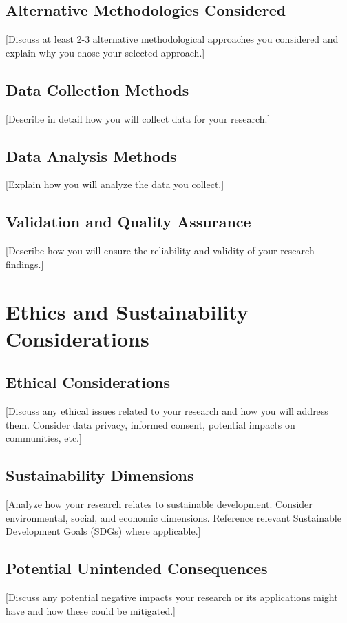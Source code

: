 \documentclass[12pt,a4paper]{article}
\begin{document}
\subsection{Alternative Methodologies Considered}
[Discuss at least 2-3 alternative methodological approaches you considered and explain why you chose your selected approach.]

\subsection{Data Collection Methods}
[Describe in detail how you will collect data for your research.]

\subsection{Data Analysis Methods}
[Explain how you will analyze the data you collect.]

\subsection{Validation and Quality Assurance}
[Describe how you will ensure the reliability and validity of your research findings.]

\section{Ethics and Sustainability Considerations}
\label{sec:ethics}

\subsection{Ethical Considerations}
[Discuss any ethical issues related to your research and how you will address them. Consider data privacy, informed consent, potential impacts on communities, etc.]

\subsection{Sustainability Dimensions}
[Analyze how your research relates to sustainable development. Consider environmental, social, and economic dimensions. Reference relevant Sustainable Development Goals (SDGs) where applicable.]

\subsection{Potential Unintended Consequences}
[Discuss any potential negative impacts your research or its applications might have and how these could be mitigated.]
\end{document}
